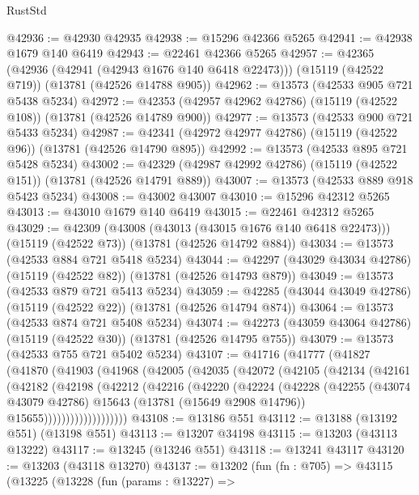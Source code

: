 \begin{lexlean}{RustStd}
\begin{coremodule}
@42936 := @42930 @42935
@42938 := @15296 @42366 @5265
@42941 := @42938 @1679 @140 @6419
@42943 := @22461 @42366 @5265
@42957 := @42365
    (@42936 (@42941 (@42943 @1676 @140 @6418 @22473)))
    (@15119 (@42522 @719))
    (@13781 (@42526 @14788 @905))
@42962 := @13573 (@42533 @905 @721 @5438 @5234)
@42972 := @42353 (@42957 @42962 @42786) (@15119 (@42522 @108)) (@13781 (@42526 @14789 @900))
@42977 := @13573 (@42533 @900 @721 @5433 @5234)
@42987 := @42341 (@42972 @42977 @42786) (@15119 (@42522 @96)) (@13781 (@42526 @14790 @895))
@42992 := @13573 (@42533 @895 @721 @5428 @5234)
@43002 := @42329 (@42987 @42992 @42786) (@15119 (@42522 @151)) (@13781 (@42526 @14791 @889))
@43007 := @13573 (@42533 @889 @918 @5423 @5234)
@43008 := @43002 @43007
@43010 := @15296 @42312 @5265
@43013 := @43010 @1679 @140 @6419
@43015 := @22461 @42312 @5265
@43029 := @42309
    (@43008 (@43013 (@43015 @1676 @140 @6418 @22473)))
    (@15119 (@42522 @73))
    (@13781 (@42526 @14792 @884))
@43034 := @13573 (@42533 @884 @721 @5418 @5234)
@43044 := @42297 (@43029 @43034 @42786) (@15119 (@42522 @82)) (@13781 (@42526 @14793 @879))
@43049 := @13573 (@42533 @879 @721 @5413 @5234)
@43059 := @42285 (@43044 @43049 @42786) (@15119 (@42522 @22)) (@13781 (@42526 @14794 @874))
@43064 := @13573 (@42533 @874 @721 @5408 @5234)
@43074 := @42273 (@43059 @43064 @42786) (@15119 (@42522 @30)) (@13781 (@42526 @14795 @755))
@43079 := @13573 (@42533 @755 @721 @5402 @5234)
@43107 := @41716
    (@41777
      (@41827
        (@41870
          (@41903
            (@41968
              (@42005
                (@42035
                  (@42072
                    (@42105
                      (@42134
                        (@42161
                          (@42182
                            (@42198
                              (@42212
                                (@42216
                                  (@42220
                                    (@42224
                                      (@42228
                                        (@42255
                                          (@43074 @43079 @42786)
                                          @15643
                                          (@13781 (@15649 @2908 @14796))
                                          @15655)))))))))))))))))))
@43108 := @13186 @551
@43112 := @13188 (@13192 @551) (@13198 @551)
@43113 := @13207 @34198
@43115 := @13203 (@43113 @13222)
@43117 := @13245 (@13246 @551)
@43118 := @13241 @43117
@43120 := @13203 (@43118 @13270)
@43137 := @13202
    (fun (fn : @705) =>
    @43115
      (@13225
        (@13228
          (fun (params : @13227) =>

\end{coremodule}
\end{lexlean}
